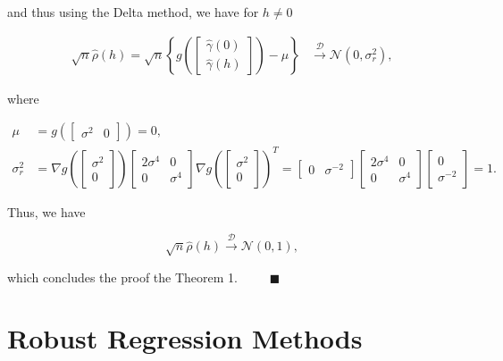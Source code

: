 \documentclass[]{book}
\theoremstyle{definition}
\theoremstyle{definition}
\theoremstyle{definition}
\theoremstyle{remark}
\begin{document}
and thus using the Delta method, we have for \(h \neq 0\)

\[
\begin{aligned}
    \sqrt{n}\hat{\rho}(h) =
    \sqrt{n}\left\{g\left(
        \begin{bmatrix}
         \hat{\gamma} \left( 0 \right) \\
         \hat{\gamma} \left( h \right)
        \end{bmatrix} \right)
    - {\mu} \right\}
    &\overset{\mathcal{D}}{\to} 
    \mathcal{N}\left(0, \sigma_r^2 \right),
    \end{aligned}
\]

where

\[
\begin{aligned}
{\mu} &= g\left(\begin{bmatrix}
         \sigma^2 & 0
        \end{bmatrix} \right) = 0,\\
\sigma_r^2 &= \nabla g\left(\begin{bmatrix}
         \sigma^2 \\
         0
        \end{bmatrix} \right) \begin{bmatrix}
         2\sigma^4 & 0\\
         0 & \sigma^4
        \end{bmatrix} \nabla g\left(\begin{bmatrix}
         \sigma^2 \\
         0
        \end{bmatrix} \right)^{T}
         = \begin{bmatrix}
         0 & \sigma^{-2}
        \end{bmatrix}  \begin{bmatrix}
         2\sigma^4 & 0\\
         0 & \sigma^4
        \end{bmatrix} \begin{bmatrix}
         0 \\
         \sigma^{-2}
        \end{bmatrix} = 1.
    \end{aligned}
\]

Thus, we have

\[
\sqrt{n}\hat{\rho}(h) \overset{\mathcal{D}}{\to} 
    \mathcal{N}\left(0, 1 \right),
\]

which concludes the proof the Theorem 1.
\(\;\;\;\;\;\;\;\; \blacksquare\)

\hypertarget{appendixb}{%
\chapter{Robust Regression Methods}\label{appendixb}}
\end{document}
